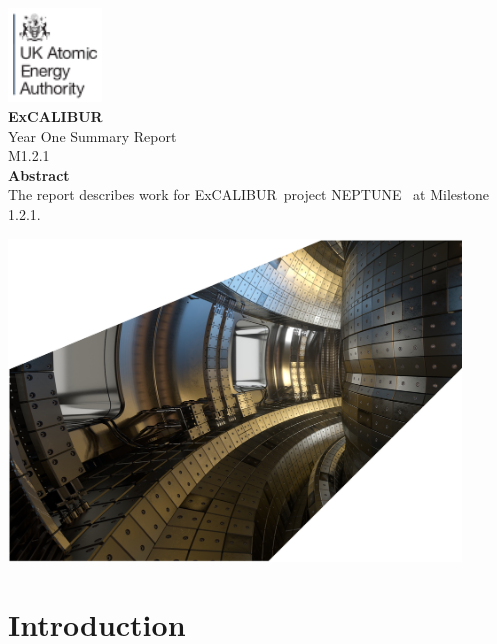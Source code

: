 \documentclass[11pt,twoside,a4paper]{article}
\newcommand{\nep}{\textsc{NEPTUNE}}
\newcommand{\exc}{\textsc{E}x\textsc{CALIBUR}}
\newcommand{\culhamtitle}{\LARGE Year One Summary Report  \\[1.0\baselineskip] M1.2.1 }%
\begin{document}
\begin{titlepage}%
\vspace*{-30mm}%
\includegraphics[width=2.5cm]{../corpics/cofaplus} \\[2.0\baselineskip]%
{\LARGE {\textbf{\textsf{ExCALIBUR}}}}\\[2.0\baselineskip]%
{\LARGE \culhamtitle } \\[2.0\baselineskip]%
{\textbf{\textsf{Abstract}}}\\%
The report describes work for \exc \ project \nep \ %
at Milestone 1.2.1. %
\vfill%
\centerline{\includegraphics[width=0.9\textwidth]{../corpics/tokintcrop}}%
\end{titlepage}%



\clearpage
\section{Introduction}\label{sec:intro}

\clearpage
\end{document}
